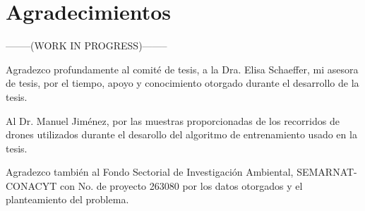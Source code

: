 
\chapter{Agradecimientos}

--------(WORK IN PROGRESS)--------

Agradezco profundamente al comité de tesis, a la Dra. Elisa Schaeffer, mi asesora de tesis, por el tiempo, apoyo y conocimiento otorgado durante el desarrollo de la tesis.

Al Dr. Manuel Jiménez, por las muestras proporcionadas de los recorridos de drones utilizados durante el desarollo del algoritmo de entrenamiento usado en la tesis.

Agradezco también al Fondo Sectorial de Investigación Ambiental, SEMARNAT-CONACYT con No. de proyecto 263080  por los datos otorgados y el planteamiento del problema.